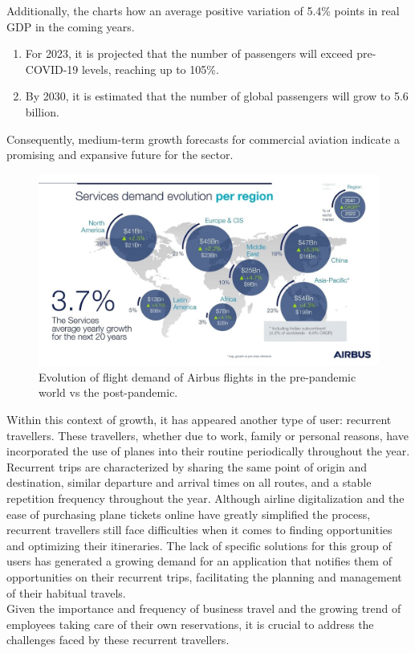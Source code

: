 \documentclass[../memory.tex]{subfiles}
\begin{document}
Additionally, the charts how an average positive variation of 5.4\% points in
real GDP in the coming years.
\begin{enumerate}[label = -]
	\item For 2023, it is projected that the number of passengers will exceed
	      pre-COVID-19 levels, reaching up to 105\%.
	\item By 2030, it is estimated that the number of global passengers will grow
	      to 5.6 billion.
\end{enumerate}
Consequently, medium-term growth forecasts for commercial aviation indicate a
promising and expansive future for the sector.
\begin{figure}[H]
	\centering
	\includegraphics[width=\textwidth]{./assets/airbus-service-demand.png}
	\caption{Evolution of flight demand of Airbus flights in the pre-pandemic
		world vs the post-pandemic.}
\end{figure}
Within this context of growth, it has appeared another type of user: recurrent
travellers. These travellers, whether due to work, family or personal reasons,
have incorporated the use of planes into their routine periodically throughout
the year.
\\[8pt]
Recurrent trips are characterized by sharing the same point of origin and
destination, similar departure and arrival times on all routes, and a stable
repetition frequency throughout the year. Although airline digitalization and
the ease of purchasing plane tickets online have greatly simplified the process,
recurrent travellers still face difficulties when it comes to finding
opportunities and optimizing their itineraries. The lack of specific solutions
for this group of users has generated a growing demand for an application that
notifies them of opportunities on their recurrent trips, facilitating the
planning and management of their habitual travels.
\\[8pt]
Given the importance and frequency of business travel and the growing trend of
employees taking care of their own reservations, it is crucial to address the
challenges faced by these recurrent travellers.
\end{document}
